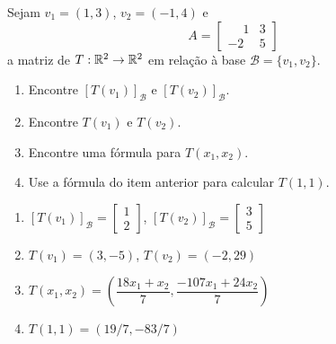 \documentclass[12pt]{exam}
\begin{document}
\begin{exercicio}
    Sejam $v_1 = (1,3)$, $v_2 = (-1, 4)$ e
    \[
        A = \begin{bmatrix}
            \phantom{-}1 & 3\\
            -2 & 5
        \end{bmatrix}
    \]
    a matriz de $T : \mathbb{R}^2 \to \mathbb{R}^2$ em relação à base $\mathcal{B} = \{v_1, v_2\}$.
    \begin{enumerate}[label={\alph*})]
        \item Encontre $[T(v_1)]_\mathcal{B}$ e $[T(v_2)]_\mathcal{B}$.

        \item Encontre $T(v_1)$ e $T(v_2)$.

        \item Encontre uma fórmula para $T(x_1, x_2)$.

        \item Use a fórmula do item anterior para calcular $T(1, 1)$.
    \end{enumerate}

    \begin{solucao}
        \begin{enumerate}[label={\alph*})]
            \item $[T(v_1)]_\mathcal{B} = \begin{bmatrix} 1\\2\end{bmatrix}$, $[T(v_2)]_\mathcal{B} = \begin{bmatrix} 3\\5\end{bmatrix}$

            \item $T(v_1) = (3, -5)$, $T(v_2) = (-2, 29)$

            \item $T(x_1, x_2) = \left(\dfrac{18x_1 + x_2}{7}, \dfrac{-107x_1 + 24x_2}{7}\right)$

            \item $T(1, 1) = (19/7, -83/7)$
        \end{enumerate}
    \end{solucao}
\end{exercicio}
\end{document}
